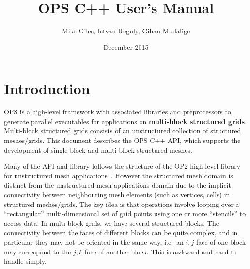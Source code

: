 \documentclass[11pt]{article}
\date{December 2015}
\begin{document}
\title{OPS C++ User's Manual}
\author{Mike Giles, Istvan Reguly, Gihan Mudalige}
\maketitle

\newpage


\tableofcontents




\newpage
\section{Introduction}


OPS is a high-level framework with associated libraries and preprocessors to generate parallel executables for
applications on \textbf{multi-block structured grids}. Multi-block structured grids consists of an unstructured
collection of structured meshes/grids. This document describes the OPS C++ API, which supports the development
of single-block and multi-block structured meshes.

Many of the API and library follows the structure of the OP2 high-level library for unstructured mesh
applications~\cite{op2}. However the structured mesh domain is distinct from the unstructured mesh applications domain
due to the implicit connectivity between neighbouring mesh elements (such as vertices, cells) in structured
meshes/grids. The key idea is that operations involve looping over a ``rectangular'' multi-dimensional set of grid
points using one or more ``stencils'' to access data. In multi-block grids, we have several structured blocks.  The 
connectivity between the faces of different blocks can be quite complex, and in particular they may not be oriented in 
the same way, i.e.~an $i,j$ face of one block may correspond to the $j,k$ face of another block.  This is awkward and 
hard to handle simply.
\end{document}
